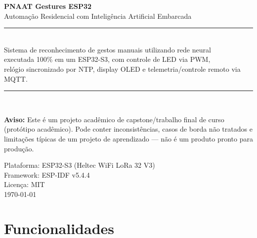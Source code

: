 \documentclass[11pt,a4paper]{article}
\begin{document}
\begin{titlepage}
    \centering
    \vspace*{2cm}
    {\Huge \bfseries PNAAT Gestures ESP32}\\[0.5cm]
    {\Large Automação Residencial com Inteligência Artificial Embarcada}\\[2cm]

    \rule{\linewidth}{0.5pt}\\[0.3cm]
    {\large Sistema de reconhecimento de gestos manuais utilizando rede neural\\
    executada 100\% em um ESP32-S3, com controle de LED via PWM,\\
    relógio sincronizado por NTP, display OLED e telemetria/controle remoto via MQTT.}\\[0.3cm]
    \rule{\linewidth}{0.5pt}\\[2cm]

    \begin{tcolorbox}[colback=yellow!10,colframe=orange!70!black,width=0.85\linewidth,breakable]
        \textbf{Aviso:} Este é um projeto acadêmico de capstone/trabalho final de curso (protótipo acadêmico).
        Pode conter inconsistências, casos de borda não tratados e limitações típicas de um projeto de aprendizado —
        não é um produto pronto para produção.
    \end{tcolorbox}

    \vfill
    {\large Plataforma: ESP32-S3 (Heltec WiFi LoRa 32 V3)\\
    Framework: ESP-IDF v5.4.4\\
    Licença: MIT}\\[1cm]

    {\large \today}
\end{titlepage}

\tableofcontents
\newpage


\section{Funcionalidades}
\end{document}
